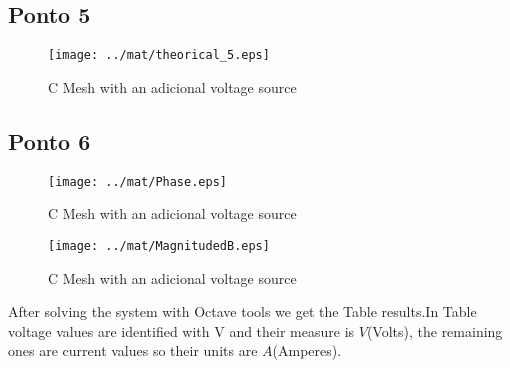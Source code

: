 \subsection{Ponto 5}

\begin{figure}[h] \centering
\texttt{[image: ../mat/theorical\_5.eps]}
\caption{C Mesh with an adicional voltage source} %
\label{fig:mat4}
\end{figure}


\subsection{Ponto 6}

\begin{figure}[h] \centering
\texttt{[image: ../mat/Phase.eps]}
\caption{C Mesh with an adicional voltage source} %
\label{fig:mat5db}
\end{figure}

\begin{figure}[h] \centering
\texttt{[image: ../mat/MagnitudedB.eps]}
\caption{C Mesh with an adicional voltage source} %
\label{fig:mat5ps}
\end{figure}



After solving the system with Octave tools we get the Table results.In Table voltage values are identified with V and their measure is $V$(Volts), the remaining ones are current values so their units are $A$(Amperes).





